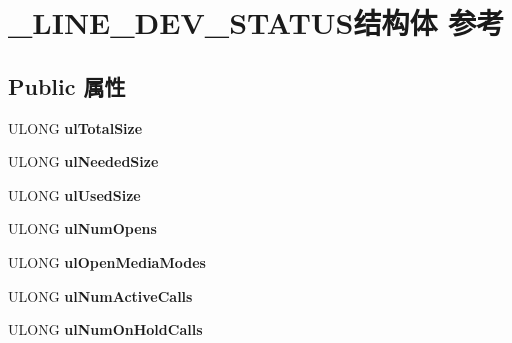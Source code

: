 \hypertarget{struct___l_i_n_e___d_e_v___s_t_a_t_u_s}{}\section{\+\_\+\+L\+I\+N\+E\+\_\+\+D\+E\+V\+\_\+\+S\+T\+A\+T\+U\+S结构体 参考}
\label{struct___l_i_n_e___d_e_v___s_t_a_t_u_s}
\subsection*{Public 属性}
\begin{DoxyCompactItemize}
\item 
\mbox{\label{struct___l_i_n_e___d_e_v___s_t_a_t_u_s_adda6fbb1c7393a33ad5195b7aae03df8}} 
U\+L\+O\+NG {\bfseries ul\+Total\+Size}
\item 
\mbox{\label{struct___l_i_n_e___d_e_v___s_t_a_t_u_s_a0a1ea95b1f406263e24646b0b677ab3e}} 
U\+L\+O\+NG {\bfseries ul\+Needed\+Size}
\item 
\mbox{\label{struct___l_i_n_e___d_e_v___s_t_a_t_u_s_a3a316595aff71804334465fb6e770367}} 
U\+L\+O\+NG {\bfseries ul\+Used\+Size}
\item 
\mbox{\label{struct___l_i_n_e___d_e_v___s_t_a_t_u_s_aeb5b0571d18cb6f2d2d773b3fb2cdd9b}} 
U\+L\+O\+NG {\bfseries ul\+Num\+Opens}
\item 
\mbox{\label{struct___l_i_n_e___d_e_v___s_t_a_t_u_s_a9d7468115774dea285bef5d7c0816069}} 
U\+L\+O\+NG {\bfseries ul\+Open\+Media\+Modes}
\item 
\mbox{\label{struct___l_i_n_e___d_e_v___s_t_a_t_u_s_a777eee3156eb81363f88f94800e1a38f}} 
U\+L\+O\+NG {\bfseries ul\+Num\+Active\+Calls}
\item 
\mbox{\label{struct___l_i_n_e___d_e_v___s_t_a_t_u_s_a789db0d0a9fd44099e765192a84ba728}} 
U\+L\+O\+NG {\bfseries ul\+Num\+On\+Hold\+Calls}
\item 

\end{DoxyCompactItemize}
